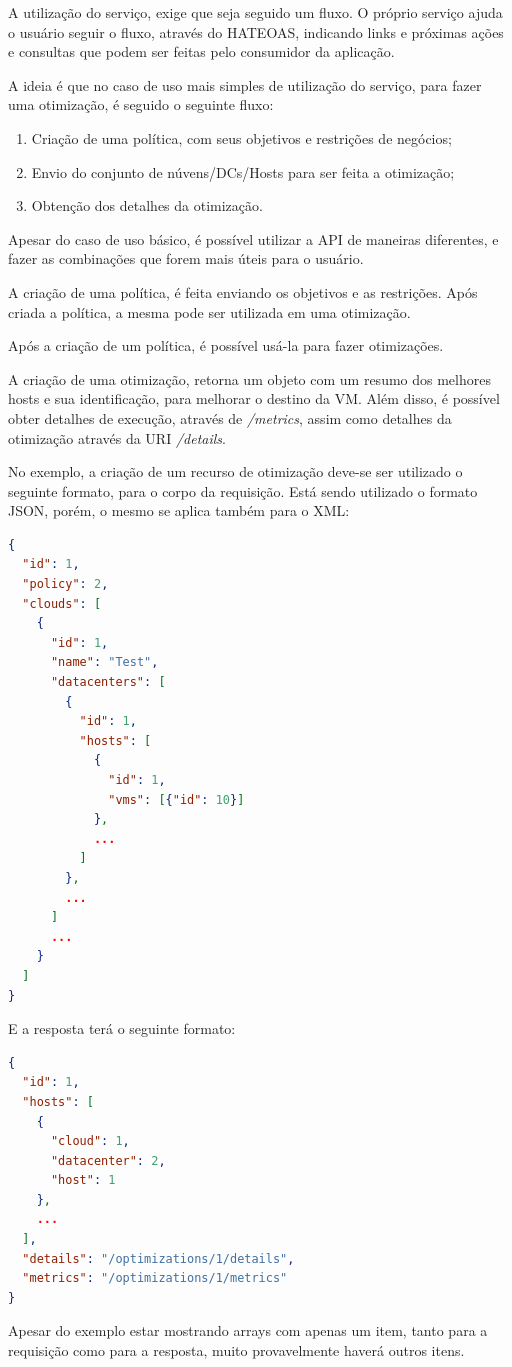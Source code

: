 A utilização do serviço, exige que seja seguido um fluxo. O próprio serviço 
ajuda o usuário seguir o fluxo, através do HATEOAS, indicando links e próximas
ações e consultas que podem ser feitas pelo consumidor da aplicação.

A ideia é que no caso de uso mais simples de utilização do serviço, 
para fazer uma otimização, é seguido o seguinte fluxo:

\begin{enumerate}
 \item Criação de uma política, com seus objetivos e restrições de negócios;
 \item Envio do conjunto de núvens/DCs/Hosts para ser feita a otimização;
 \item Obtenção dos detalhes da otimização.
\end{enumerate}

Apesar do caso de uso básico, é possível utilizar a API de maneiras diferentes,
e fazer as combinações que forem mais úteis para o usuário.

A criação de uma política, é feita enviando os objetivos e as restrições.
Após criada a política, a mesma pode ser utilizada em uma otimização. 



Após a criação de um política, é possível usá-la para fazer otimizações.

A criação de uma otimização, retorna um objeto com um resumo dos melhores hosts
e sua identificação, para melhorar o destino da VM.
Além disso, é possível obter detalhes de execução, através de \textit{/metrics}, assim
como detalhes da otimização através da URI \textit{/details}.

No exemplo, a criação de um recurso de otimização deve-se ser utilizado o seguinte formato, para o corpo da requisição. Está sendo
utilizado o formato JSON, porém, o mesmo se aplica também para o XML:

\begin{lstlisting}[language=json,firstnumber=1]
{
  "id": 1,
  "policy": 2,
  "clouds": [
    {
      "id": 1,
      "name": "Test",
      "datacenters": [
        {
          "id": 1,
          "hosts": [
            {
              "id": 1,
              "vms": [{"id": 10}]
            },
            ...
          ]
        },
        ...
      ]
      ...
    }
  ]
}
\end{lstlisting}

E a resposta terá o seguinte formato:

\begin{lstlisting}[language=json,firstnumber=1]
{
  "id": 1,
  "hosts": [
    {
      "cloud": 1,
      "datacenter": 2,
      "host": 1
    }, 
    ...
  ],
  "details": "/optimizations/1/details",
  "metrics": "/optimizations/1/metrics"
}
\end{lstlisting}

Apesar do exemplo estar mostrando arrays com apenas um item,
tanto para a requisição como para a resposta, muito provavelmente 
haverá outros itens.